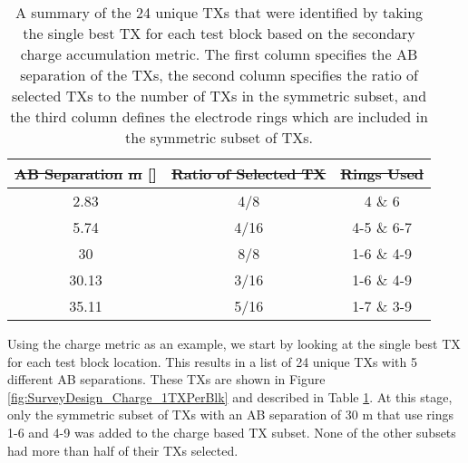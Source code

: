 \documentclass[preprint,authoryear,12pt]{elsarticle}
\providecommand{\DIFaddtex}[1]{{\protect\color{blue}\uwave{#1}}} %
\providecommand{\DIFdeltex}[1]{{\protect\color{red}\sout{#1}}}                      %
\providecommand{\DIFaddFL}[1]{\DIFadd{#1}} %
\providecommand{\DIFdelFL}[1]{\DIFdel{#1}} %
\providecommand{\DIFaddbeginFL}{} %
\providecommand{\DIFaddendFL}{} %
\providecommand{\DIFdelbeginFL}{} %
\providecommand{\DIFdelendFL}{} %
\providecommand{\DIFadd}[1]{\texorpdfstring{\DIFaddtex{#1}}{#1}} %
\providecommand{\DIFdel}[1]{\texorpdfstring{\DIFdeltex{#1}}{}} %
\begin{document}
\begin{table} [htp]
   \footnotesize
   \begin{center}
      \begin{tabular}{| c | c | c |}
         \hline
         \DIFdelbeginFL \DIFdelFL{AB Separation }%
\DIFdelFL{m}%
\DIFdelendFL \DIFaddbeginFL \textbf{\DIFaddFL{AB Separation }[\DIFaddFL{m}]} \DIFaddendFL & \DIFdelbeginFL \DIFdelFL{Ratio of Selected TX  }\DIFdelendFL \DIFaddbeginFL \textbf{\DIFaddFL{Ratio of Selected TX}}  \DIFaddendFL & \DIFdelbeginFL \DIFdelFL{Rings Used }\DIFdelendFL \DIFaddbeginFL \textbf{\DIFaddFL{Rings Used}} \DIFaddendFL \\
         \hline
         2.83 & 4/8 & 4 \& 6\\
         \hline
         5.74 & 4/16 & 4-5 \& 6-7\\
         \hline
         30 & 8/8 & 1-6 \& 4-9\\
         \hline
         30.13 & 3/16 & 1-6 \& 4-9\\
         \hline
         35.11 & 5/16 & 1-7 \& 3-9\\
         \hline
      \end{tabular}
   \end{center}
\caption{A summary of the 24 unique TXs that were identified by taking the single best TX for each test block based on the secondary charge accumulation metric. The first column specifies the AB separation of the TXs, the second column specifies the ratio of selected TXs to the number of TXs in the symmetric subset, and the third column defines the electrode rings which are included in the symmetric subset of TXs.}
\label{table:SurveyDesign_Charge1TxPerBlk}
\end{table}


Using the charge metric as an example, we start by looking at the single best TX for each test block location. This results in a list of 24 unique TXs with 5 different AB separations. These TXs are shown in Figure \ref{fig:SurveyDesign_Charge_1TXPerBlk} and described in Table \ref{table:SurveyDesign_Charge1TxPerBlk}. At this stage, only the symmetric subset of TXs with an AB separation of 30 m that use rings 1-6 and 4-9 was added to the charge based TX subset. None of the other subsets had more than half of their TXs selected.
\end{document}

